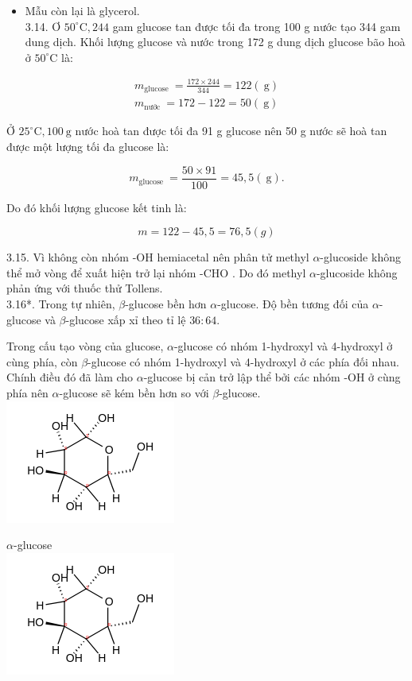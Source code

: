 \documentclass[10pt]{article}
\begin{document}
\begin{itemize}
  \item Mẫu còn lại là glycerol.\\
3.14. Ơ $50^{\circ} \mathrm{C}, 244$ gam glucose tan được tối đa trong 100 g nước tạo 344 gam dung dịch. Khối lượng glucose và nước trong 172 g dung dịch glucose bão hoà ở $50^{\circ} \mathrm{C}$ là:
\end{itemize}

$$
\begin{gathered}
m_{\text {glucose }}=\frac{172 \times 244}{344}=122(\mathrm{~g}) \\
m_{\text {nước }}=172-122=50(\mathrm{~g})
\end{gathered}
$$

Ở $25^{\circ} \mathrm{C}, 100 \mathrm{~g}$ nước hoà tan được tối đa 91 g glucose nên 50 g nước sẽ hoà tan được một lượng tối đa glucose là:

$$
m_{\text {glucose }}=\frac{50 \times 91}{100}=45,5(\mathrm{~g}) .
$$

Do đó khối lượng glucose kết tinh là:

$$
m=122-45,5=76,5(g)
$$

3.15. Vì không còn nhóm -OH hemiacetal nên phân tử methyl $\alpha$-glucoside không thể mở vòng để xuất hiện trở lại nhóm -CHO . Do đó methyl $\alpha$-glucoside không phản ứng với thuốc thử Tollens.\\
3.16*. Trong tự nhiên, $\beta$-glucose bền hơn $\alpha$-glucose. Độ bền tương đối của $\alpha$-glucose và $\beta$-glucose xấp xỉ theo tỉ lệ $36: 64$.

Trong cấu tạo vòng của glucose, $\alpha$-glucose có nhóm 1-hydroxyl và 4-hydroxyl ở cùng phía, còn $\beta$-glucose có nhóm 1-hydroxyl và 4-hydroxyl ở các phía đối nhau. Chính điều đó đã làm cho $\alpha$-glucose bị cản trở lập thể bởi các nhóm -OH ở cùng phía nên $\alpha$-glucose sẽ kém bền hơn so với $\beta$-glucose.\\
\includegraphics{smile-4f6b21af8319e07f12f90e78017b8a4370e942b2}

$\alpha$-glucose\\
\includegraphics{smile-be3ae122e619128d74933506b2110e6297e4ba32}
\end{document}
